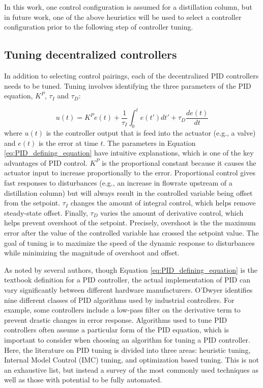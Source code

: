 In this work, one control configuration is assumed for a distillation column, but in future work, one of the above heuristics will be used to select a controller configuration prior to the following step of controller tuning.

\subsection{Tuning decentralized controllers}
In addition to selecting control pairings, each of the decentralized PID controllers needs to be tuned. Tuning involves identifying the three parameters of the PID equation, $K^P$, $\tau_I$ and $\tau_D$:

\begin{equation}
    \label{eq:PID_defining_equation}
    u(t) = K^P e(t) + \frac{1}{\tau_I}\int_0^t e(t')dt' + \tau_D \frac{de(t)}{dt}
\end{equation}
where $u(t)$ is the controller output that is feed into the actuator (e.g., a valve) and $e(t)$ is the error at time $t$.
 The parameters in Equation \ref{eq:PID_defining_equation} have intuitive explanations, which is one of the key advantages of PID control. $K^P$ is the proportional constant because it causes the actuator input to increase proportionally to the error. Proportional control gives fast responses to disturbances (e.g., an increase in flowrate upstream of a distillation column) but will always result in the controlled variable being offset from the setpoint. $\tau_I$ changes the amount of integral control, which helps remove steady-state offset.  Finally, $\tau_D$ varies the amount of derivative control, which helps prevent overshoot of the setpoint. Precisely, overshoot is the the maximum error after the value of the controlled variable has crossed the setpoint value. The goal of tuning is to maximize the speed of the dynamic response to disturbances while minimizing the magnitude of overshoot and offset. 
    
As noted by several authors, though Equation \ref{eq:PID_defining_equation} is the textbook definition for a PID controller, the actual implementation of PID can vary significantly between different hardware manufacturers.\citep{ODwyer2009, KiamHeongAng2005}  O'Dwyer identifies nine different classes of PID algorithms used by industrial controllers.\citep{ODwyer2009} For example, some controllers include a low-pass filter on the derivative term to prevent drastic changes in error response. Algorithms used to tune PID controllers often assume a particular form of the PID equation, which is important to consider when choosing an algorithm for tuning a PID controller.  
Here, the literature on PID tuning is divided into three areas: heuristic tuning, Internal Model Control (IMC) tuning, and optimization based tuning. This is not an exhaustive list, but instead a survey of the most commonly used techniques as well as those with potential to be fully automated.  

